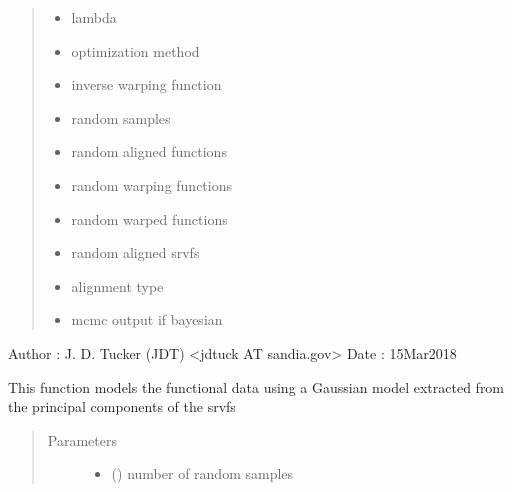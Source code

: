 \documentclass[letterpaper,10pt,english]{sphinxmanual}
\begin{document}
\begin{fulllineitems}
\begin{quote}
\begin{description}
\begin{itemize}
\item {} 
 \textendash{} lambda

\item {} 
 \textendash{} optimization method

\item {} 
 \textendash{} inverse warping function

\item {} 
 \textendash{} random samples

\item {} 
 \textendash{} random aligned functions

\item {} 
 \textendash{} random warping functions

\item {} 
 \textendash{} random warped functions

\item {} 
 \textendash{} random aligned srvfs

\item {} 
 \textendash{} alignment type

\item {} 
 \textendash{} mcmc output if bayesian

\end{itemize}

\end{description}\end{quote}

Author :  J. D. Tucker (JDT) \textless{}jdtuck AT sandia.gov\textgreater{}
Date   :  15\sphinxhyphen{}Mar\sphinxhyphen{}2018

\begin{fulllineitems}
\label{\detokenize{time_warping:time_warping.fdawarp.gauss_model}}
This function models the functional data using a Gaussian model
extracted from the principal components of the srvfs
\begin{quote}\begin{description}
\item[{Parameters}] \leavevmode\begin{itemize}
\item {} 
 () \textendash{} number of random samples


\end{itemize}
\end{description}
\end{quote}
\end{fulllineitems}
\end{fulllineitems}
\end{document}

